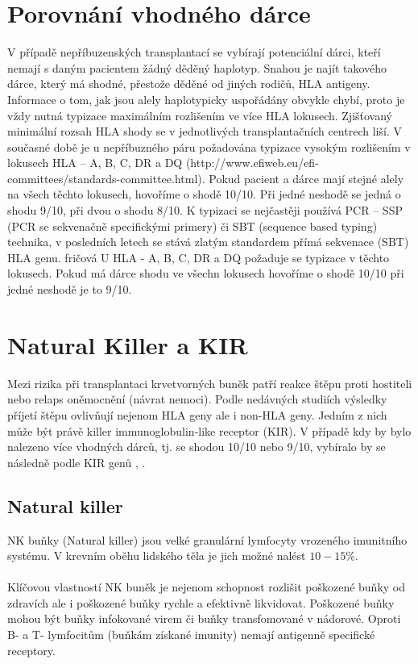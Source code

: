 \documentclass[czech,DP]{thesiskiv}
\begin{document}
\section{Porovnání vhodného dárce}
V případě nepříbuzenských transplantací se vybírají potenciální dárci, kteří nemají s daným
pacientem žádný děděný haplotyp. Snahou je najít takového dárce, který má shodné, přestože
děděné od jiných rodičů, HLA antigeny. Informace o tom, jak jsou alely haplotypicky
uspořádány obvykle chybí, proto je vždy nutná typizace maximálním rozlišením ve více
HLA lokusech. Zjišťovaný minimální rozsah HLA shody se v jednotlivých transplantačních
centrech liší. V současné době je u nepříbuzného páru požadována typizace vysokým
rozlišením v lokusech HLA – A, B, C, DR a DQ (http://www.efiweb.eu/efi-
committees/standards-committee.html). Pokud pacient a dárce mají stejné alely na všech
těchto lokusech, hovoříme o shodě 10/10. Při jedné neshodě se jedná o shodu 9/10, při dvou o
shodu 8/10.
K typizaci se nejčastěji používá PCR – SSP (PCR se sekvenačně specifickými primery) či
SBT (sequence based typing) technika, v posledních letech se stává zlatým standardem přímá
sekvenace (SBT) HLA genu.
fričová
U HLA - A, B, C, DR a DQ požaduje se typizace v těchto lokusech. Pokud má dárce shodu ve všechn lokusech hovoříme o shodě 10/10 při jedné neshodě je to 9/10.
\\

\section{Natural Killer a KIR}
Mezi rizika při transplantaci krvetvorných buněk patří reakce štěpu proti hostiteli nebo relaps oněmocnění (návrat nemoci). Podle nedávných studiích výsledky příjetí štěpu ovlivňují nejenom HLA geny ale i non-HLA geny. Jedním z nich může být právě killer immunoglobulin-like receptor (KIR). V případě kdy by bylo nalezeno více vhodných dárců, tj. se shodou 10/10 nebo 9/10, vybíralo by se následně podle KIR genů \cite{KIR_transplantace_jindra}, \cite{Frycova_bakalarka}.

\subsection{Natural killer}
NK buňky (Natural killer) jsou velké granulární lymfocyty vrozeného imunitního systému. V krevním oběhu lidského těla je jich možné nalést $10-15\%$. 
\\
\\
Klíčovou vlastností NK buněk je nejenom schopnost rozlišit poškozené buňky od zdravích ale i poškozené buňky rychle a efektivně likvidovat. Poškozené buňky mohou být buňky infokované virem či buňky transfomované v nádorové. Oproti B- a T- lymfocitům (buňkám získané imunity) nemají antigenně specifické receptory. 
\end{document}
